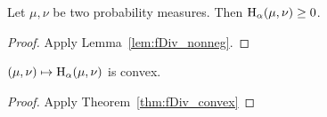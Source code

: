 \begin{lemma}
  \label{lem:hellingerAlpha_nonneg}
  Let $\mu, \nu$ be two probability measures. Then $\operatorname{H}_\alpha(\mu, \nu) \ge 0$.
\end{lemma}

\begin{proof}
Apply Lemma~\ref{lem:fDiv_nonneg}.
\end{proof}

\begin{lemma}
  \label{lem:hellingerAlpha_convex}
  $(\mu, \nu) \mapsto \operatorname{H}_\alpha(\mu, \nu)$ is convex.
\end{lemma}

\begin{proof}
Apply Theorem~\ref{thm:fDiv_convex}
\end{proof}
